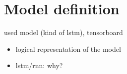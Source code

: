 \section{Model definition}
\label{sec:model}
used model (kind of lstm), tensorboard
\begin{itemize}
	\item logical representation of the model
	\item lstm/rnn: why?
\end{itemize}